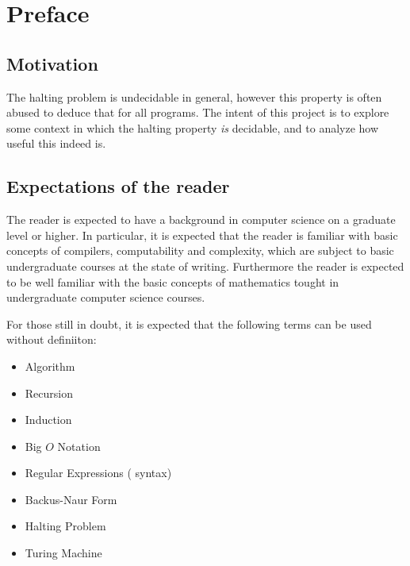 \chapter{Preface}

\section{Motivation}

The halting problem is undecidable in general, however this property is often
abused to deduce that for all programs. The intent of this project is to
explore some context in which the halting property \emph{is} decidable, and to
analyze how useful this indeed is.

\section{Expectations of the reader}

The reader is expected to have a background in computer science on a graduate
level or higher. In particular, it is expected that the reader is familiar with
basic concepts of compilers, computability and complexity, which are subject to
basic undergraduate courses at the state of writing. Furthermore the reader is
expected to be well familiar with the basic concepts of mathematics tought in
undergraduate computer science courses.

For those still in doubt, it is expected that the following terms can be used
without definiiton:

\begin{itemize}

\item Algorithm

\item Recursion

\item Induction

\item Big $O$ Notation

\item Regular Expressions ( syntax)

\item Backus-Naur Form

\item Halting Problem

\item Turing Machine

\end{itemize}


